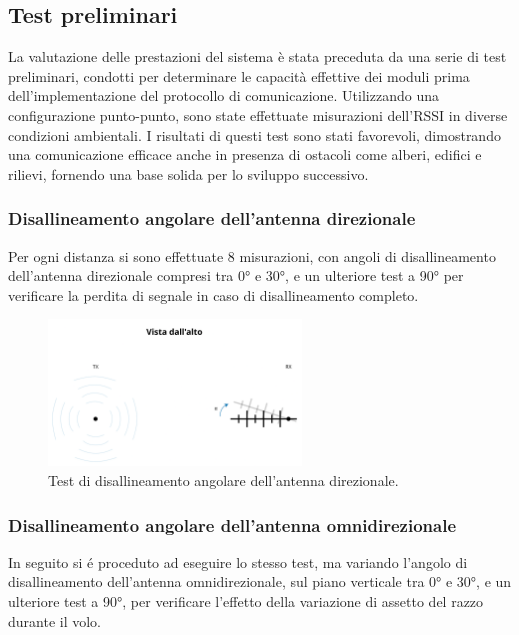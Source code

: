 \documentclass[12pt,a4paper,twoside]{book}
\begin{document}
\newpage
\subsection{Test preliminari}
La valutazione delle prestazioni del sistema è stata preceduta da una serie di test
preliminari, condotti per determinare le capacità effettive dei moduli prima
dell'implementazione del protocollo di comunicazione.
Utilizzando una configurazione punto-punto, sono state effettuate misurazioni dell'\ac{RSSI}
in diverse condizioni ambientali.
I risultati di questi test sono stati favorevoli, dimostrando una comunicazione
efficace anche in presenza di ostacoli come alberi, edifici e rilievi, fornendo
una base solida per lo sviluppo successivo.

\subsubsection{Disallineamento angolare dell'antenna direzionale}
Per ogni distanza si sono effettuate 8 misurazioni, con angoli di disallineamento
dell'antenna direzionale compresi tra 0° e 30°, e un ulteriore test a 90° per
verificare la perdita di segnale in caso di disallineamento completo.

\begin{figure}[H]
    \centering
    \includegraphics[width=0.6\textwidth]{img/tests/telemetry-test-direct.png}
    \caption{Test di disallineamento angolare dell'antenna direzionale.}
    \label{fig:directional-test}
\end{figure}
\newpage
\subsubsection{Disallineamento angolare dell'antenna omnidirezionale}
In seguito si \'e proceduto ad eseguire lo stesso test, ma variando l'angolo di
disallineamento dell'antenna omnidirezionale, sul piano verticale tra 0° e 30°,
e un ulteriore test a 90°, per verificare l'effetto della variazione di assetto
del razzo durante il volo.
\end{document}
